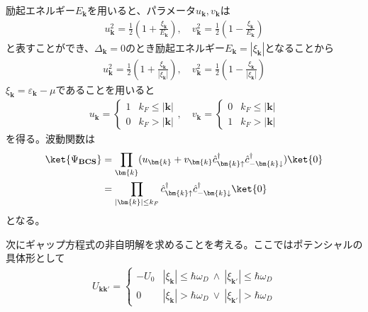 \documentclass[dvipdfmx, 11pt, a4paper]{jsarticle}
\numberwithin{equation}{section}
\theoremstyle{definition}
\begin{document}
    \begin{derivationBox}
        励起エネルギー$E_{\bm{k}}$を用いると、パラメータ$u_{\bm{k}},v_{\bm{k}}$は
        \begin{align}
            u_{\bm{k}}^2 = \frac{1}{2} \left( 1 + \frac{\xi_{\bm{k}}}{E_{\bm{k}}} \right),\quad v_{\bm{k}}^2 = \frac{1}{2} \left( 1 - \frac{\xi_{\bm{k}}}{E_{\bm{k}}} \right)
        \end{align}
        と表すことができ、$\Delta_{\bm{k}}=0$のとき励起エネルギー$E_{\bm{k}} = |\xi_{\bm{k}}|$となることから
        \begin{align}
            u_{\bm{k}}^2 = \frac{1}{2} \left( 1 + \frac{\xi_{\bm{k}}}{ |\xi_{\bm{k}}|} \right),\quad v_{\bm{k}}^2 = \frac{1}{2} \left( 1 - \frac{\xi_{\bm{k}}}{ |\xi_{\bm{k}}|} \right)
        \end{align}
        $\xi_{\bm{k}} = \varepsilon_{\bm{k}} - \mu$であることを用いると
        \begin{align}
            u_{\bm{k}} = 
            \left\{
            \begin{matrix}
                1&k_F \le |\bm{k}|\\
                0&k_F > |\bm{k}|
            \end{matrix}
            \right.,\quad 
            v_{\bm{k}} = 
            \left\{
            \begin{matrix}
                0&k_F \le |\bm{k}|\\
                1&k_F > |\bm{k}|
            \end{matrix}
            \right.
        \end{align}
        を得る。波動関数は
        \begin{align}
            \ket{\Psi_{\textbf{BCS}}} &= \prod_{\bm{k}}(u_{\bm{k}}+v_{\bm{k}}\hat{c}_{\bm{k}\uparrow}^\dagger \hat{c}_{-\bm{k}\downarrow}^\dagger) \ket{0} \notag \\
            &= \prod_{|\bm{k}| \le k_F} \hat{c}_{\bm{k}\uparrow}^\dagger \hat{c}_{-\bm{k}\downarrow}^\dagger \ket{0}
        \end{align}
        となる。
    \end{derivationBox}
    次にギャップ方程式の非自明解を求めることを考える。ここではポテンシャルの具体形として
    \begin{align}
        U_{\bm{k}\bm{k}'} =
        \left\{ 
        \begin{matrix}
            -U_0&|\xi_{\bm{k}}| \le \hbar \omega_D\ \land\ |\xi_{\bm{k}'}| \le \hbar \omega_D\\
            0&|\xi_{\bm{k}}| > \hbar \omega_D\  \lor\ |\xi_{\bm{k}'}| > \hbar \omega_D
        \end{matrix}
        \right.
    \end{align}
\end{document}
